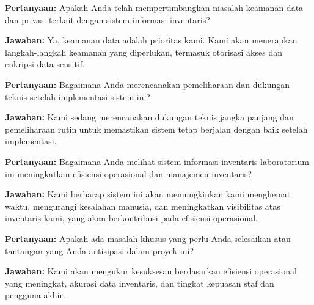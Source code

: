 \begin{flushleft}
	\textbf{Pertanyaan:} Apakah Anda telah mempertimbangkan masalah keamanan data dan privasi terkait dengan sistem informasi inventaris?

	\textbf{Jawaban:} Ya, keamanan data adalah prioritas kami. Kami akan menerapkan langkah-langkah keamanan yang diperlukan, termasuk otorisasi akses dan enkripsi data sensitif.

	\textbf{Pertanyaan:} Bagaimana Anda merencanakan pemeliharaan dan dukungan teknis setelah implementasi sistem ini?

	\textbf{Jawaban:} Kami sedang merencanakan dukungan teknis jangka panjang dan pemeliharaan rutin untuk memastikan sistem tetap berjalan dengan baik setelah implementasi.

	\textbf{Pertanyaan:} Bagaimana Anda melihat sistem informasi inventaris laboratorium ini meningkatkan efisiensi operasional dan manajemen inventaris?

	\textbf{Jawaban:} Kami berharap sistem ini akan memungkinkan kami menghemat waktu, mengurangi kesalahan manusia, dan meningkatkan visibilitas atas inventaris kami, yang akan berkontribusi pada efisiensi operasional.

	\textbf{Pertanyaan:} Apakah ada masalah khusus yang perlu Anda selesaikan atau tantangan yang Anda antisipasi dalam proyek ini?

	\textbf{Jawaban:} Kami akan mengukur kesuksesan berdasarkan efisiensi operasional yang meningkat, akurasi data inventaris, dan tingkat kepuasan staf dan pengguna akhir.

\end{flushleft}

